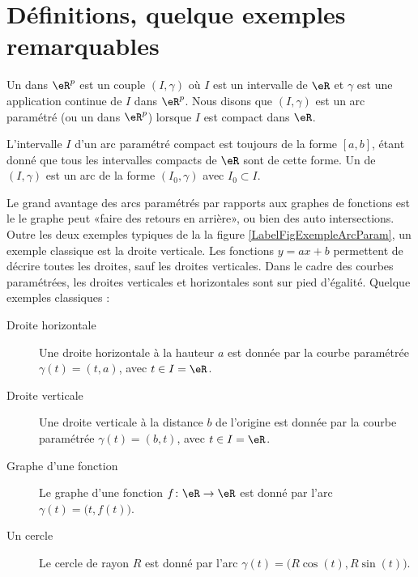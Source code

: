 
\section{Définitions, quelque exemples remarquables}        \label{SecDeExCPar}

\begin{definition}
    Un  dans $\eR^p$ est un couple $(I,\gamma)$ où $I$ est un intervalle de $\eR$ et $\gamma$ est une application continue de $I$ dans $\eR^p$. Nous disons que $(I,\gamma)$ est un arc paramétré  (ou un  dans $\eR^p$) lorsque $I$ est compact dans $\eR$. 
\end{definition}
L'intervalle $I$ d'un arc paramétré compact est toujours de la forme $[a,b]$, étant donné que tous les intervalles compacts de $\eR$ sont de cette forme. Un  de $(I,\gamma)$ est un arc de la forme $(I_0,\gamma)$ avec $I_0\subset I$.


Le grand avantage des arcs paramétrés par rapports aux graphes de fonctions est le le graphe peut «faire des retours en arrière», ou bien des auto intersections. Outre les deux exemples typiques de la la figure \ref{LabelFigExempleArcParam}, un exemple classique est la droite verticale. Les fonctions $y=ax+b$ permettent de décrire toutes les droites, sauf les droites verticales. Dans le cadre des courbes paramétrées, les droites verticales et horizontales sont sur pied d'égalité. Quelque exemples classiques :
\begin{description}
    \item[Droite horizontale] Une droite horizontale à la hauteur $a$ est donnée par la courbe paramétrée $\gamma(t)=(t,a)$, avec $t\in I=\eR$.
    \item[Droite verticale] Une droite verticale à la distance $b$ de l'origine est donnée par la courbe paramétrée $\gamma(t)=(b,t)$, avec $t\in I=\eR$.
    \item[Graphe d'une fonction]\label{PgGrqFnGamma} Le graphe d'une fonction $f\colon \eR\to \eR$ est donné par l'arc $\gamma(t)=\big( t,f(t) \big)$. 
    \item[Un cercle] Le cercle de rayon $R$ est donné par l'arc $\gamma(t)=\big( R\cos(t),R\sin(t) \big)$.
\end{description}

